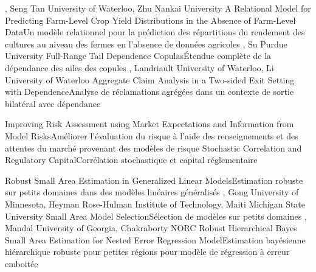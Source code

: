 {
,  {Seng Tan}
{University of Waterloo},  {Zhu}
{Nankai University}
}
{A Relational Model for Predicting Farm-Level Crop Yield Distributions in the Absence of Farm-Level Data}{Un modèle relationnel pour la prédiction des répartitions du rendement des cultures au niveau des fermes en l’absence de données agricoles}
{\bubbleE \enspace \screenE}
{
,  {Su}
{Purdue University}
}
{Full-Range Tail Dependence Copulas}{Étendue complète de la dépendance des ailes des copules}
{\bubbleE \enspace \screenE}
{
,  {Landriault}
{University of Waterloo},  {Li}
{University of Waterloo}
}
{Aggregate Claim Analysis in a Two-sided Exit Setting with Dependence}{Analyse de réclamations agrégées dans un contexte de sortie bilatéral avec dépendance}
{\bubbleE \enspace \screenE}


{
}
{Improving Risk Assessment using Market Expectations and Information from Model Risks}{Améliorer l’évaluation du risque à l’aide des renseignements et des attentes du marché provenant des modèles de risque }
{\bubbleE \enspace \screenE}
{
}
{Stochastic Correlation and Regulatory Capital}{Corrélation stochastique et capital réglementaire}
{\bubbleE \enspace \screenE}


{
}
{Robust Small Area Estimation in Generalized Linear Models}{Estimation robuste sur petits domaines dans des modèles linéaires généralisés}
{\bubbleE \enspace \screenE}
{
,  {Gong}
{University of Minnesota},  {Heyman}
{Rose-Hulman Institute of Technology},  {Maiti}
{Michigan State University}
}
{Small Area Model Selection}{Sélection de modèles sur petits domaines}
{\bubbleE \enspace \screenE}
{
,  {Mandal}
{University of Georgia},  {Chakraborty}
{NORC}
}
{Robust Hierarchical Bayes Small Area Estimation for Nested Error Regression Model}{Estimation bayésienne hiérarchique robuste pour petites régions pour modèle de régression à erreur emboitée}
{\bubbleE \enspace \screenE}

